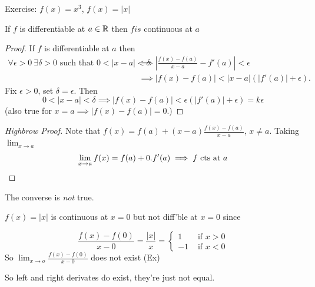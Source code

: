 Exercise: $f(x) = x^3$, $f(x) = |x|$\\

\begin{proposition}
If $f$ is differentiable at $a\in\mathbb{R}$ then $f is$ continuous at $a$	
\end{proposition}

\begin{proof}[Proof] If $f$ is differentiable at $a$ then
	\[\begin{aligned}\forall \epsilon >0~ \exists \delta  > 0 \text{ such that } 0 < |x-a| < \delta &\implies \left|\frac{f(x) - f(a)}{x-a} - f'(a)\right| < \epsilon \\ 
	&\implies |f(x) - f(a)| < |x-a|(|f'(a)| + \epsilon).	
\end{aligned}
\] 
	Fix $\epsilon > 0$, set $\delta = \epsilon$. Then \[0 < |x-a| < \delta \implies  |f(x) - f(a)| < \epsilon(|f'(a)| + \epsilon) = k\epsilon\] (also true for $x = a \implies |f(x) - f(a)| = 0$.)
\end{proof}

\begin{proof}[Highbrow Proof]
Note that $f(x) = f(a) + (x-a)\frac{f(x) -f(a)}{x-a}$, $x \neq a$. Taking  $\lim_{x\to a}$  \[\lim_{x\to a}f(x) = f(a) + 0.f'(a) \implies f \text{ cts at } a\qedhere\]\end{proof}

The converse is \emph{not} true.\vspace*{10pt}

\begin{example}
$f(x) = |x|$ is continuous at $x = 0$ but not diff'ble at $x = 0$ since 

\[\frac{f(x) -f(0)}{x-0} = \frac{|x|}{x} = \begin{cases}
 1 & \text{ if } x > 0\\
 -1 & \text{ if } x < 0	
 \end{cases}
\]
So $\lim_{x\to o} \frac{f(x) -f(0)}{x-0}$ does not exist (Ex)

\begin{center}
\end{center}




So left and right derivates do exist, they're just not equal. 
\end{example}\vspace*{5pt}

